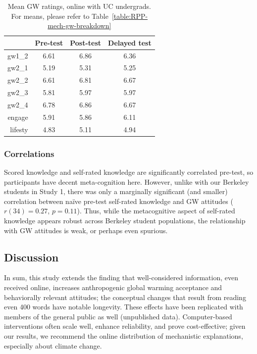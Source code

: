 \begin{table}
\caption{Mean GW ratings, online with UC undergrads. For means, please refer to
         Table~\ref{table:RPP-mech-gw-breakdown}} 
\label{table:uc-online-gw-means}
\centering
\begin{tabular}{>{\sffamily}rccc}
  \toprule
 & Pre-test & Post-test & Delayed test \\ 
  \midrule
  gw1_2 & 6.61 & 6.86 & 6.36 \\ 
  gw2_1 & 5.19 & 5.31 & 5.25 \\ 
  gw2_2 & 6.61 & 6.81 & 6.67 \\ 
  gw2_3 & 5.81 & 5.97 & 5.97 \\ 
  gw2_4 & 6.78 & 6.86 & 6.67 \\ 
  engage & 5.91 & 5.86 & 6.11 \\ 
  lifesty & 4.83 & 5.11 & 4.94 \\ 
  \bottomrule
\end{tabular}
\end{table}

\subsubsection{Correlations}

Scored knowledge and self-rated knowledge are significantly correlated pre-test,
so participants have decent meta-cognition here.
However, unlike with our Berkeley students in Study 1, there was only a
marginally significant (and smaller) correlation between na\"ive pre-test
self-rated knowledge and GW attitudes ($r(34)=0.27$, $p=0.11$). Thus, while the
metacognitive aspect of self-rated knowledge appears robust across Berkeley
student populations, the relationship with GW attitudes is weak, or perhaps even
spurious.

\subsection{Discussion}

In sum, this study extends the finding that well-considered information, even
received online, increases anthropogenic global warming acceptance and
behaviorally relevant attitudes; the conceptual changes that result from reading
even 400 words have notable longevity. These effects have been replicated with
members of the general public as well (unpublished data). Computer-based
interventions often scale well, enhance reliability, and prove cost-effective;
given our results, we recommend the online distribution of mechanistic
explanations, especially about climate change.  

